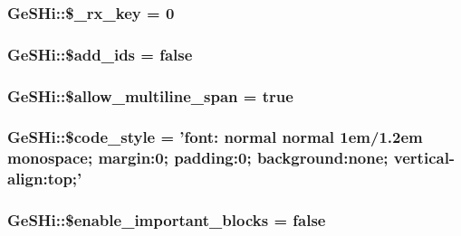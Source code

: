 \hypertarget{class_ge_s_hi_a611e34117b54a25d834a60ee18c30e28}{
\subsubsection[{\$\-\_\-rx\-\_\-key}]{\setlength{\rightskip}{0pt plus 5cm}Ge\-S\-Hi\-::\$\-\_\-rx\-\_\-key = 0}}\label{class_ge_s_hi_a611e34117b54a25d834a60ee18c30e28}
\hypertarget{class_ge_s_hi_a70ee7154455257ff993d299a2bd35d5d}{
\subsubsection[{\$add\-\_\-ids}]{\setlength{\rightskip}{0pt plus 5cm}Ge\-S\-Hi\-::\$add\-\_\-ids = false}}\label{class_ge_s_hi_a70ee7154455257ff993d299a2bd35d5d}
\hypertarget{class_ge_s_hi_a82ab423fe47e494e1f4c2983a5fb78bd}{
\subsubsection[{\$allow\-\_\-multiline\-\_\-span}]{\setlength{\rightskip}{0pt plus 5cm}Ge\-S\-Hi\-::\$allow\-\_\-multiline\-\_\-span = true}}\label{class_ge_s_hi_a82ab423fe47e494e1f4c2983a5fb78bd}
\hypertarget{class_ge_s_hi_a8266c7d18371bd0c84f4459b307c87a0}{
\subsubsection[{\$code\-\_\-style}]{\setlength{\rightskip}{0pt plus 5cm}Ge\-S\-Hi\-::\$code\-\_\-style = 'font\-: normal normal 1em/1.\-2em monospace; margin\-:0; padding\-:0; background\-:none; vertical-\/align\-:top;'}}\label{class_ge_s_hi_a8266c7d18371bd0c84f4459b307c87a0}
\hypertarget{class_ge_s_hi_ac1a9230577ab22a7d88012daf8c9cb00}{
\subsubsection[{\$enable\-\_\-important\-\_\-blocks}]{\setlength{\rightskip}{0pt plus 5cm}Ge\-S\-Hi\-::\$enable\-\_\-important\-\_\-blocks = false}}\label{class_ge_s_hi_ac1a9230577ab22a7d88012daf8c9cb00}
